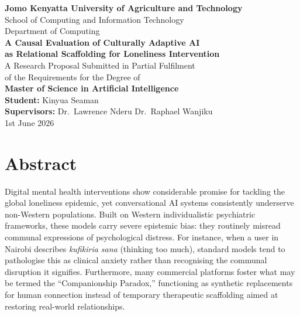 \documentclass[12pt,a4paper]{article}
\begin{document}
\begin{titlepage}
\centering
\vspace*{1cm}

{\Large\bfseries Jomo Kenyatta University of Agriculture and Technology}\\[0.3cm]
{\large School of Computing and Information Technology}\\[0.3cm]
{\large Department of Computing}\\[1.5cm]

{\LARGE\bfseries A Causal Evaluation of Culturally Adaptive AI\\[0.3cm]
as Relational Scaffolding for Loneliness Intervention}\\[2cm]

{\large A Research Proposal Submitted in Partial Fulfilment\\
of the Requirements for the Degree of\\[0.3cm]
\textbf{Master of Science in Artificial Intelligence}}\\[2cm]

{\large\textbf{Student:} Kinyua Seaman}\\[0.5cm]
{\large\textbf{Supervisors:} Dr.\ Lawrence Nderu \quad Dr.\ Raphael Wanjiku}\\[2cm]

{\large 1st June 2026}

\vfill
\end{titlepage}

\section*{Abstract}

Digital mental health interventions show considerable promise for tackling the global loneliness epidemic, yet conversational AI systems consistently underserve non-Western populations. Built on Western individualistic psychiatric frameworks, these models carry severe epistemic bias: they routinely misread communal expressions of psychological distress. For instance, when a user in Nairobi describes \textit{kufikiria sana} (thinking too much), standard models tend to pathologise this as clinical anxiety rather than recognising the communal disruption it signifies. Furthermore, many commercial platforms foster what may be termed the ``Companionship Paradox,'' functioning as synthetic replacements for human connection instead of temporary therapeutic scaffolding aimed at restoring real-world relationships.
\end{document}
